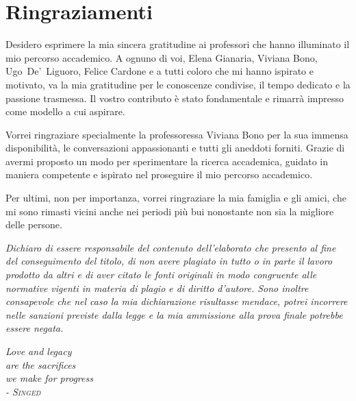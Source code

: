 \thispagestyle{empty}

\chapter*{Ringraziamenti}

\noindent
Desidero esprimere la mia sincera gratitudine ai professori che hanno illuminato il mio percorso accademico. A ognuno di voi, Elena Gianaria, Viviana Bono, \mbox{Ugo De' Liguoro}, Felice Cardone e a tutti coloro che mi hanno ispirato e motivato, va la mia gratitudine per le conoscenze condivise, il tempo dedicato e la passione trasmessa. Il vostro contributo è stato fondamentale e rimarrà impresso come modello a cui aspirare. 

Vorrei ringraziare specialmente la professoressa Viviana Bono per la sua immensa disponibilità, le conversazioni appassionanti e tutti gli aneddoti forniti. Grazie di avermi proposto un modo per sperimentare la ricerca accademica, guidato in maniera competente e ispirato nel proseguire il mio percorso accademico.

Per ultimi, non per importanza, vorrei ringraziare la mia famiglia e gli amici, che mi sono rimasti vicini anche nei periodi più bui nonostante non sia la migliore delle persone.

\vspace*{92mm}
\noindent
\textsl{Dichiaro di essere responsabile del contenuto dell'elaborato che presento al fine del
	conseguimento del titolo, di non avere plagiato in tutto o in parte il lavoro prodotto da
	altri e di aver citato le fonti originali in modo congruente alle normative vigenti in
	materia di plagio e di diritto d'autore. Sono inoltre consapevole che nel caso la mia
	dichiarazione risultasse mendace, potrei incorrere nelle sanzioni previste dalla legge e
	la mia ammissione alla prova finale potrebbe essere negata.}

\newpage

\thispagestyle{empty}
\vspace*{60mm}
\begin{flushright}
	\slshape
    Love and legacy\\
    are the sacrifices\\
    we make for progress\\
    - \textsc{Singed}
\end{flushright}

